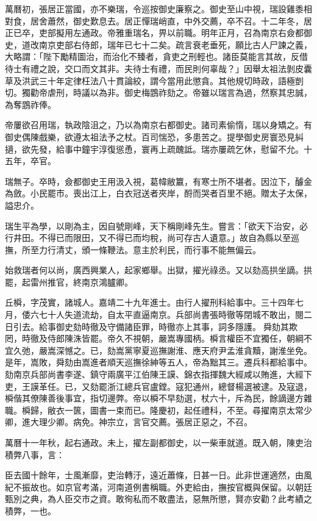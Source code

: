 \begin{pinyinscope}
萬曆初，張居正當國，亦不樂瑞，令巡按御史廉察之。御史至山中視，瑞設雞黍相對食，居舍蕭然，御史歎息去。居正憚瑞峭直，中外交薦，卒不召。十二年冬，居正已卒，吏部擬用左通政。帝雅重瑞名，畀以前職。明年正月，召為南京右僉都御史，道改南京吏部右侍郎，瑞年已七十二矣。疏言衰老垂死，願比古人尸諫之義，大略謂：「陛下勵精圖治，而治化不臻者，貪吏之刑輕也。諸臣莫能言其故，反借待士有禮之說，交口而文其非。夫待士有禮，而民則何辜哉？」因舉太祖法剝皮囊草及洪武三十年定律枉法八十貫論絞，謂今當用此懲貪。其他規切時政，語極剴切。獨勸帝虐刑，時議以為非。御史梅鵾祚劾之。帝雖以瑞言為過，然察其忠誠，為奪鵾祚俸。

帝屢欲召用瑞，執政陰沮之，乃以為南京右都御史。諸司素偷惰，瑞以身矯之。有御史偶陳戲樂，欲遵太祖法予之杖。百司惴恐，多患苦之。提學御史房寰恐見糾擿，欲先發，給事中鐘宇淳復慫恿，寰再上疏醜詆。瑞亦屢疏乞休，慰留不允。十五年，卒官。

瑞無子。卒時，僉都御史王用汲入視，葛幃敝籝，有寒士所不堪者。因泣下，醵金為斂。小民罷市。喪出江上，白衣冠送者夾岸，酹而哭者百里不絕。贈太子太保，謚忠介。

瑞生平為學，以剛為主，因自號剛峰，天下稱剛峰先生。嘗言：「欲天下治安，必行井田。不得已而限田，又不得已而均稅，尚可存古人遺意。」故自為縣以至巡撫，所至力行清丈，頒一條鞭法。意主於利民，而行事不能無偏云。

始救瑞者何以尚，廣西興業人，起家鄉舉。出獄，擢光祿丞。又以劾高拱坐謫。拱罷，起雷州推官，終南京鴻臚卿。

丘橓，字茂實，諸城人。嘉靖二十九年進士。由行人擢刑科給事中。三十四年七月，倭六七十人失道流劫，自太平直逼南京。兵部尚書張時徹等閉城不敢出，閱二日引去。給事御史劾時徹及守備諸臣罪，時徹亦上其事，詞多隱護。舜劾其欺罔，時徹及侍郎陳洙皆罷。帝久不視朝，嚴嵩專國柄。橓言權臣不宜獨任，朝綱不宜久弛，嚴嵩深憾之。已，劾嵩黨寧夏巡撫謝淮、應天府尹孟淮貪黷，謝淮坐免。是年，嵩敗，舜劾由嵩進者順天巡撫徐紳等五人，帝為黜其三。遷兵科都給事中。劾南京兵部尚書李遂、鎮守兩廣平江伯陳王謨、錦衣指揮魏大經咸以賄進，大經下吏，王謨革任。已，又劾罷浙江總兵官盧鏜。寇犯通州，總督楊選被逮。及寇退，橓偕其僚陳善後事宜，指切邊弊。帝以橓不早劾選，杖六十，斥為民，餘謫邊方雜職。橓歸，敝衣一篋，圖書一束而已。隆慶初，起任禮科，不至。尋擢南京太常少卿，進大理少卿。病免。神宗立，言官交薦。張居正惡之，不召。

萬曆十一年秋，起右通政。未上，擢左副都御史，以一柴車就道。既入朝，陳吏治積弊八事，言：

臣去國十餘年，士風漸靡，吏治轉汙，遠近蕭條，日甚一日。此非世運適然，由風紀不振故也。如京官考滿，河南道例書稱職。外吏給由，撫按官概與保留。以朝廷甄別之典，為人臣交市之資。敢徇私而不敢盡法，惡無所懲，賢亦安勸？此考績之積弊，一也。


\end{pinyinscope}
